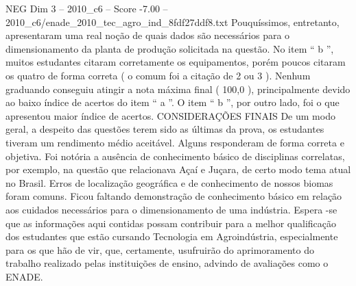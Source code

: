 \begin{textsample}{NEG Dim 3 – 2010\_c6 – Score -7.00 – 2010\_c6/enade\_2010\_tec\_agro\_ind\_8fdf27ddf8.txt}
Pouquíssimos, entretanto, apresentaram uma real noção de quais dados são necessários para o dimensionamento da planta de produção solicitada na questão.
No item “ b ”, muitos estudantes citaram corretamente os equipamentos, porém poucos citaram os quatro de forma correta ( o comum foi a citação de 2 ou 3 ).
Nenhum graduando conseguiu atingir a nota máxima final ( 100,0 ), principalmente devido ao baixo índice de acertos do item “ a ”.
O item “ b ”, por outro lado, foi o que apresentou maior índice de acertos.
CONSIDERAÇÕES FINAIS De um modo geral, a despeito das questões terem sido as últimas da prova, os estudantes tiveram um rendimento médio aceitável.
Alguns responderam de forma correta e objetiva.
Foi notória a ausência de conhecimento básico de disciplinas correlatas, por exemplo, na questão que relacionava Açaí e Juçara, de certo modo tema atual no Brasil.
Erros de localização geográfica e de conhecimento de nossos biomas foram comuns.
Ficou faltando demonstração de conhecimento básico em relação aos cuidados necessários para o dimensionamento de uma indústria.
Espera -se que as informações aqui contidas possam contribuir para a melhor qualificação dos estudantes que estão cursando Tecnologia em Agroindústria, especialmente para os que hão de vir, que, certamente, usufruirão do aprimoramento do trabalho realizado pelas instituições de ensino, advindo de avaliações como o ENADE.

\end{textsample}
